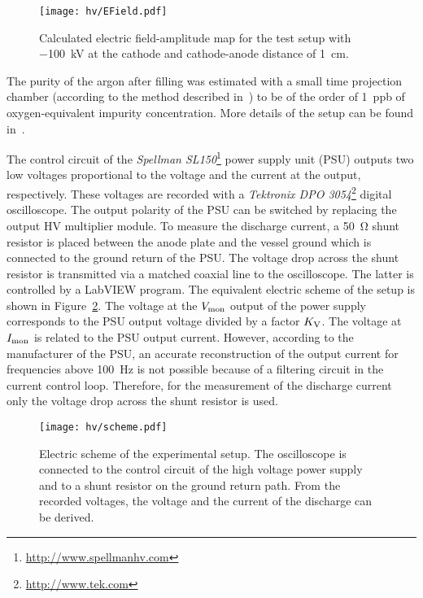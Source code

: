 \begin{figure}[htb]
	\centering	
	\texttt{[image: hv/EField.pdf]}
	\caption{Calculated electric field-amplitude map for the test setup with \SI{-100}{\kilo\volt} at the cathode and cathode-anode distance of \SI{1}{\centi\metre}.}
	\label{fig:hv_efield}
\end{figure}

The purity of the argon after filling was estimated with a small time projection chamber (according to the method described in~\cite{2photonAbs}) to be of the order of \SI{1}{ppb} of oxygen-equivalent impurity concentration.
More details of the setup can be found in~\cite{breakdown_14}.

The control circuit of the \emph{Spellman SL150}\footnote{\href{http://www.spellmanhv.com}{http://www.spellmanhv.com}} power supply unit (PSU) outputs two low voltages proportional to the voltage and the current at the output, respectively.
These voltages are recorded with a \emph{Tektronix DPO 3054}\footnote{\href{http://www.tek.com}{http://www.tek.com}} digital oscilloscope.
The output polarity of the PSU can be switched by replacing the output HV multiplier module.
To measure the discharge current, a \SI{50}{\ohm} shunt resistor is placed between the anode plate and the vessel ground which is connected to the ground return of the PSU. The voltage drop across the shunt resistor is transmitted via a matched coaxial line to the oscilloscope.
The latter is controlled by a LabVIEW program.
The equivalent electric scheme of the setup is shown in Figure~\ref{fig:hv_scheme}. 
The voltage at the $V_{\mathrm{mon}}$ output of the power supply corresponds to the PSU output voltage divided by a factor $K_{\mathrm{V}}$.
The voltage at $I_{\mathrm{mon}}$ is related to the PSU output current.
However, according to the manufacturer of the PSU, an accurate reconstruction of the output current for frequencies above \SI{100}{\hertz} is not possible because of a filtering circuit in the current control loop.
Therefore, for the measurement of the discharge current only the voltage drop across the shunt resistor is used.

\begin{figure}[htb]
	\centering
	\texttt{[image: hv/scheme.pdf]}
	\caption{Electric scheme of the experimental setup. The oscilloscope is connected to the control circuit of the high voltage power supply and to a shunt resistor on the ground return path. From the recorded voltages, the voltage and the current of the discharge can be derived.}
	\label{fig:hv_scheme}
\end{figure}

